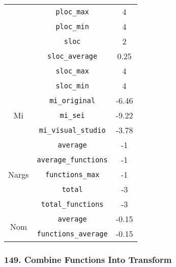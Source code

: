 \begin{center}
\begin{tabular}{ |c|c|c| }
          & \verb|ploc_max|                       & 4          \\
          & \verb|ploc_min|                       & 4          \\
          & \verb|sloc|                           & 2          \\
          & \verb|sloc_average|                   & 0.25       \\
          & \verb|sloc_max|                       & 4          \\
          & \verb|sloc_min|                       & 4          \\
    \hline
    \multirow{ 3 }{6em}{ Mi }
          & \verb|mi_original|                    & -6.46      \\
          & \verb|mi_sei|                         & -9.22      \\
          & \verb|mi_visual_studio|               & -3.78      \\
    \hline
    \multirow{ 5 }{6em}{ Nargs }
          & \verb|average|                        & -1         \\
          & \verb|average_functions|              & -1         \\
          & \verb|functions_max|                  & -1         \\
          & \verb|total|                          & -3         \\
          & \verb|total_functions|                & -3         \\
    \hline
    \multirow{ 2 }{6em}{ Nom }
          & \verb|average|                        & -0.15      \\
          & \verb|functions_average|              & -0.15      \\
    \hline
  \end{tabular}
\end{center}
\subsubsection{ 149. Combine Functions Into Transform }

